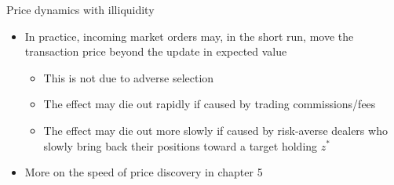 \documentclass[english,10pt
,aspectratio=169
]{beamer}
\begin{document}
%
%


\begin{frame}{Price dynamics with illiquidity}
	\begin{itemize}
		\item In practice, incoming market orders may, in the short run, move the transaction price beyond the update in expected value
		\begin{itemize}
			\item This is not due to adverse selection
			\item The effect may die out rapidly if caused by trading commissions/fees
			\item The effect may die out more slowly if caused by risk-averse dealers who slowly bring back their positions toward a target holding $z^*$
		\end{itemize}
		\item More on the speed of price discovery in chapter 5
	\end{itemize}
\end{frame}
\end{document}
